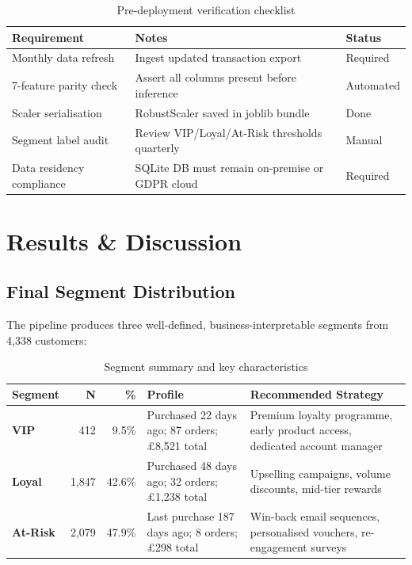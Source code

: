\documentclass[12pt,a4paper]{report}
\begin{document}
\begin{table}[H]
\centering
\caption{Pre-deployment verification checklist}
\begin{tabularx}{\textwidth}{lXl}
\toprule
\textbf{Requirement} & \textbf{Notes} & \textbf{Status} \\
\midrule
Monthly data refresh & Ingest updated transaction export & Required \\
7-feature parity check & Assert all columns present before inference & Automated \\
Scaler serialisation & RobustScaler saved in joblib bundle & Done \\
Segment label audit & Review VIP/Loyal/At-Risk thresholds quarterly & Manual \\
Data residency compliance & SQLite DB must remain on-premise or GDPR cloud & Required \\
\bottomrule
\end{tabularx}
\end{table}

\chapter{Results \& Discussion}

\section{Final Segment Distribution}

The pipeline produces three well-defined, business-interpretable segments from 4,338 customers:

\begin{table}[H]
\centering
\caption{Segment summary and key characteristics}
\begin{tabularx}{\textwidth}{lrrXX}
\toprule
\textbf{Segment} & \textbf{N} & \textbf{\%} & \textbf{Profile} & \textbf{Recommended Strategy} \\
\midrule
\textcolor{vipgold}{\textbf{VIP}} & 412 & 9.5\% & Purchased 22 days ago; 87 orders; £8,521 total & Premium loyalty programme, early product access, dedicated account manager \\[4pt]
\textcolor{loyalgreen}{\textbf{Loyal}} & 1,847 & 42.6\% & Purchased 48 days ago; 32 orders; £1,238 total & Upselling campaigns, volume discounts, mid-tier rewards \\[4pt]
\textcolor{riskred}{\textbf{At-Risk}} & 2,079 & 47.9\% & Last purchase 187 days ago; 8 orders; £298 total & Win-back email sequences, personalised vouchers, re-engagement surveys \\
\bottomrule
\end{tabularx}
\end{table}
\end{document}
